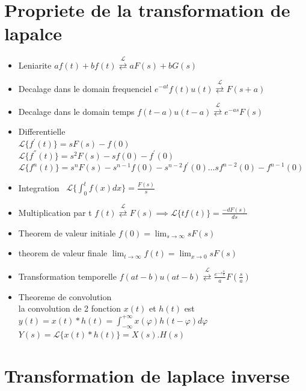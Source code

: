 \documentclass[12pt]{book}
\newcommand{\lagrange}{\mathcal{L}}
\begin{document}
        \section{Propriete de la transformation de lapalce}
            \begin{itemize}
                \item Leniarite $af(t) +bf(t)\overset{\lagrange}{\rightleftarrows} aF(s) + bG(s) $
                \item Decalage dans le domain frequenciel $e^{-at}f(t)u(t)\overset{\lagrange}{\rightleftarrows}F(s+a)$
                \item Decalage dans le domain temps $f(t-a)u(t-a)\overset{\lagrange}{\rightleftarrows}e^{-as}F(s)$
                \item Differentielle \\
                    $ \lagrange \{ f^{'}(t)\}= sF(s) - f(0)  $ \\
                    $ \lagrange \{ f^{''}(t)\} = s^2F(s) - sf(0) - f^{'}(0)  $ \\
                    $\lagrange\{ f^n(t) \} = s^nF(s) - s^{n-1}f(0)-s^{n-2}f^{'}(0)\ldots sf^{n-2}(0)-f^{n-1}(0)$
                \item Integration \
                    $ \lagrange \{ \int^t_0f(x)dx \} = \frac{F(s)}{s} $
                \item  Multiplication par t 
                    $f(t) \overset{\lagrange}{\rightleftarrows} F(s) \implies \lagrange\{ tf(t) \}=\frac{-dF(s)}{ds} $  
                \item Theorem de valeur initiale $f(0) = \lim_{s\to\infty}sF(s)$
                \item theorem de valeur finale $\lim_{t\to\infty}f(t)=\lim_{x\to 0}sF(s)$
                \item Transformation temporelle $f(at-b)u(at-b)\overset{\lagrange}{\rightleftarrows}\frac{e^{-s\frac{b}{a}}}{a}F(\frac{s}{a})$
                \item Theoreme de convolution \\
                    la convolution de 2 fonction $x(t)$ et $h(t)$ est \\
                    $y(t)= x(t)*h(t) = \int_{-\infty}^{+\infty}x(\varphi)h(t-\varphi)d\varphi$ \\
                    $Y(s) = \lagrange\{ x(t) * h(t) \} = X(s).H(s)$
            \end{itemize}
        \pagebreak
        \section{Transformation de laplace inverse}
\end{document}
